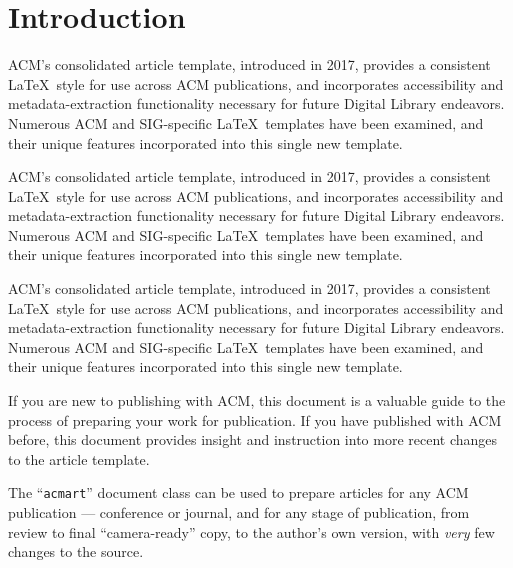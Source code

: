 \documentclass[sigplan,screen,anonymous]{acmart}
\begin{document}
%
\maketitle

\section{Introduction}
ACM's consolidated article template, introduced in 2017, provides a consistent \LaTeX\ style for use across ACM publications, and incorporates accessibility and metadata-extraction functionality necessary for future Digital Library endeavors. Numerous ACM and SIG-specific \LaTeX\ templates have been examined, and their unique features incorporated into this single new template.

ACM's consolidated article template, introduced in 2017, provides a consistent \LaTeX\ style for use across ACM publications, and incorporates accessibility and metadata-extraction functionality necessary for future Digital Library endeavors. Numerous ACM and SIG-specific \LaTeX\ templates have been examined, and their unique features incorporated into this single new template.

ACM's consolidated article template, introduced in 2017, provides a consistent \LaTeX\ style for use across ACM publications, and incorporates accessibility and metadata-extraction functionality necessary for future Digital Library endeavors. Numerous ACM and SIG-specific \LaTeX\ templates have been examined, and their unique features incorporated into this single new template.


If you are new to publishing with ACM, this document is a valuable guide to the process of preparing your work for publication. If you have published with ACM before, this document provides insight and instruction into more recent changes to the article template.

The ``\verb|acmart|'' document class can be used to prepare articles for any ACM publication --- conference or journal, and for any stage of publication, from review to final ``camera-ready'' copy, to the author's own version, with {\it very} few changes to the source.
\end{document}
